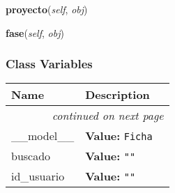     \vspace{0.5ex}

\hspace{.8\funcindent}\begin{boxedminipage}{\funcwidth}

    \raggedright \textbf{proyecto}(\textit{self}, \textit{obj})

\setlength{\parskip}{2ex}
\setlength{\parskip}{1ex}
    \end{boxedminipage}

    \label{saip:controllers:ficha_usuario_controller:FichaTableFiller:fase}

    \vspace{0.5ex}

\hspace{.8\funcindent}\begin{boxedminipage}{\funcwidth}

    \raggedright \textbf{fase}(\textit{self}, \textit{obj})

\setlength{\parskip}{2ex}
\setlength{\parskip}{1ex}
    \end{boxedminipage}



  \subsubsection{Class Variables}

    \vspace{-1cm}
\hspace{\varindent}\begin{longtable}{|p{\varnamewidth}|p{\vardescrwidth}|l}
\cline{1-2}
\cline{1-2} \centering \textbf{Name} & \centering \textbf{Description}& \\
\cline{1-2}
\endhead\cline{1-2}\multicolumn{3}{r}{\small\textit{continued on next page}}\\\endfoot\cline{1-2}
\endlastfoot\raggedright \_\-\_\-m\-o\-d\-e\-l\-\_\-\_\- & \raggedright \textbf{Value:} 
{\tt Ficha}&\\
\cline{1-2}
\raggedright b\-u\-s\-c\-a\-d\-o\- & \raggedright \textbf{Value:} 
{\tt ""}&\\
\cline{1-2}
\raggedright i\-d\-\_\-u\-s\-u\-a\-r\-i\-o\- & \raggedright \textbf{Value:} 
{\tt ""}&\\
\cline{1-2}
\end{longtable}

